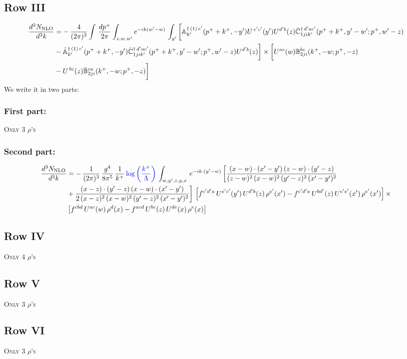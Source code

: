 \documentclass[9pt]{article}
\def\mf#1{\mathbb{#1}}
\numberwithin{equation}{section}
\begin{document}
 \subsection{Row III}
 \begin{align}
    \frac{d^{3}N_{\rm NLO}}{d^{3}k} & =   -\,\frac{4}{(2\pi)^{3}} \int\, \frac{dp^{+}}{2\pi}\int_{z,w,w^{\prime}} e^{-ik(w^{\prime}-w)}\,\int_{y^{\prime}}\bigg[\mf{A}^{\dagger\, (1)\,e^{\prime}}_{k^{\prime}}(p^{+}+k^{+},-y^{\prime})U^{\, e^{\prime}c^{\prime}}(y^{\prime})U^{d^{\prime}b}(z) \Bar{\mf{C}}^{\dagger\, d^{\prime}ac^{\prime}}_{1jik^{\prime}}(p^{+}+k^{+},y^{\prime}-w^{\prime}; p^{+},w^{\prime}-z)\notag \\ &  -\Bar{\mf{A}}^{\dagger\, (1)\,c^{\prime}}_{k^{\prime}}(p^{+}+k^{+},-y^{\prime}) \Bar{\mf{C}}^{\dagger\, d^{\prime}ac^{\prime}}_{1jik^{\prime}}(p^{+}+k^{+},y^{\prime}-w^{\prime}; p^{+},w^{\prime}-z)U^{d^{\prime}b}(z)\bigg] \times \bigg[U^{ac}(w) \mf{B}^{bc}_{2ji}(k^{+},-w;p^{+},-z)\notag \\ &  -U^{\, bc}(z)\Bar{\mf{B}}^{ca}_{2ji}(k^{+},-w; p^{+},-z)\bigg]\nonumber
\end{align}
We write it in two parts:
\subsubsection{First part:}
\textsc{Only 3 $\rho$'s}
\subsubsection{Second part:}
\begin{align}
 \frac{d^{3}N_{\rm NLO}}{d^{3}k} & =  -\, \frac{1}{(2\pi)^{3}}\,\frac{g^{4}}{8\pi^{5}}\,\frac{1}{k^{+}}\,{\color{blue}\log{\left(\frac{k^{+}}{\Lambda}\right)}}\,\int_{w,y',z,y,x}\, e^{-ik\cdot (y'-w)}\,\bigg[\frac{(x-w)\cdot (x'-y')\,(z-w)\cdot (y'-z)}{(z-w)^{2}\,(x-w)^{2}\,(y'-z)^{2}\,(x'-y')^{2}}\notag \\ & +\frac{(x-z)\cdot (y'-z)\,(x-w)\cdot (x'-y')}{2\,(x-z)^{2}\,(x-w)^{2}\,(y'-z)^{2}\,(x'-y')^{2}}\bigg]\, \left[f^{c'd'a}\,U^{e'c'}(y')\,U^{d'b}(z)\,\rho^{e'}(x')-f^{c'd'a}\, 
    U^{bd'}(z)\,U^{c'e'}(x')\,\rho^{e'}(x')\right]\times\notag \\ &  \left[f^{cbd}\,U^{ac}(w)\,\rho^{d}(x) -f^{acd}\,U^{bc}(z)\,U^{de}(x)\,\rho^{e}(x)\right] 
\end{align}
\subsection{Row IV}
\textsc{Only 4 $\rho$'s}
\subsection{Row V}
\textsc{Only 3 $\rho$'s}
\subsection{Row VI}
\textsc{Only 3 $\rho$'s}
\end{document}
